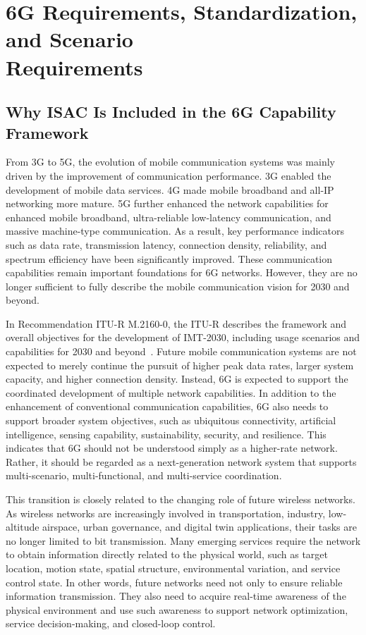  
\section[6G Requirements, Standardization, and Scenario Requirements]{6G Requirements, Standardization, and Scenario\\ Requirements}

\subsection{Why ISAC Is Included in the 6G Capability Framework}

From 3G to 5G, the evolution of mobile communication systems was mainly driven by the improvement of communication performance.
3G enabled the development of mobile data services.
4G made mobile broadband and all-IP networking more mature.
5G further enhanced the network capabilities for enhanced mobile broadband, ultra-reliable low-latency communication, and massive machine-type communication.
As a result, key performance indicators such as data rate, transmission latency, connection density, reliability, and spectrum efficiency have been significantly improved.
These communication capabilities remain important foundations for 6G networks.
However, they are no longer sufficient to fully describe the mobile communication vision for 2030 and beyond.

In Recommendation ITU-R M.2160-0, the ITU-R describes the framework and overall objectives for the development of IMT-2030, including usage scenarios and capabilities for 2030 and beyond~\cite{ITU_M2160_2023}.
Future mobile communication systems are not expected to merely continue the pursuit of higher peak data rates, larger system capacity, and higher connection density.
Instead, 6G is expected to support the coordinated development of multiple network capabilities.
In addition to the enhancement of conventional communication capabilities, 6G also needs to support broader system objectives, such as ubiquitous connectivity, artificial intelligence, sensing capability, sustainability, security, and resilience.
This indicates that 6G should not be understood simply as a higher-rate network.
Rather, it should be regarded as a next-generation network system that supports multi-scenario, multi-functional, and multi-service coordination.

This transition is closely related to the changing role of future wireless networks.
As wireless networks are increasingly involved in transportation, industry, low-altitude airspace, urban governance, and digital twin applications, their tasks are no longer limited to bit transmission.
Many emerging services require the network to obtain information directly related to the physical world, such as target location, motion state, spatial structure, environmental variation, and service control state.
In other words, future networks need not only to ensure reliable information transmission.
They also need to acquire real-time awareness of the physical environment and use such awareness to support network optimization, service decision-making, and closed-loop control.

